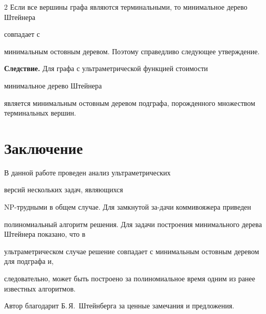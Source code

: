 \begin{multicols}{2}
Если все вершины графа являются терминальными, то минимальное дерево Штейнера


совпадает с


минимальным остовным деревом. Поэтому справедливо следующее утверждение.








\smallskip





\noindent


\textbf{Следствие.} Для графа с ультраметрической функцией стоимости


минимальное дерево Штейнера


является минимальным остовным деревом подграфа, порожденного множеством терминальных вершин.










\section{Заключение}










В данной работе проведен анализ ультрамет\-рических


версий нескольких задач, являющихся


NP-труд\-ны\-ми в общем случае. Для замкнутой за-\linebreak да\-чи коммивояжера приведен


полиномиальный \mbox{алгоритм} решения. Для задачи построения минимального дерева Штейнера показано, что в


ультрамет\-ри\-че\-ском случае решение совпадает с минимальным остовным деревом для подграфа и,


следова\-тельно, может быть построено за полиномиальное время одним из ранее известных алгоритмов.





\smallskip


Автор благодарит Б.\,Я.~Штейнберга за ценные замечания и предложения.






\end{multicols}
